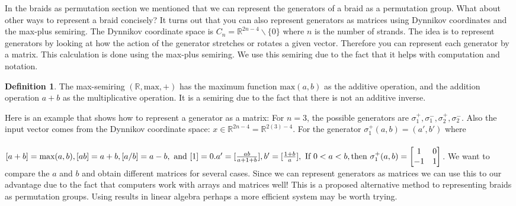 \documentclass{article}
\theoremstyle{definition}
\newtheorem{definition}{Definition}[section]
\begin{document}
In the braids as permutation section we mentioned that we can represent the generators of a braid as a permutation group. What about other ways to represent a braid concisely? It turns out that you can also represent generators as matrices using Dynnikov coordinates and the max-plus semiring. The Dynnikov coordinate space is $C_n=\mathbb{R}^{2n-4} \backslash \{0\}$ where $n$ is the number of strands. The idea is to represent generators by looking at how the action of the generator stretches or rotates a given vector. Therefore you can represent each generator by a matrix. This calculation is done using the max-plus semiring. We use this semiring due to the fact that it helps with computation and notation. 

\begin{definition}
The max-semiring $(\mathbb{R},\text{max},+)$ has the maximum function $\text{max}(a,b)$ as the additive operation, and the addition operation $a+b$ as the multiplicative operation. It is a semiring due to the fact that there is not an additive inverse.
\end{definition}

\noindent Here is an example that shows how to represent a generator as a matrix: For $n=3$, the possible generators are $\sigma_1^+, \sigma_1^-, \sigma_2^+, \sigma_2^-$. Also the input vector comes from the Dynnikov coordinate space: $x \in \mathbb{R}^{2n-4} = \mathbb{R}^{2(3)-4}$. For the generator $\sigma_1^+ (a,b)=(a',b')$ where 
\\ \\
$[a+b]=\text{max}(a,b), [ab]=a+b, [a/b]=a-b, \text{ and } [1]=0. \\ \\ a'=[\frac{ab}{a+1+b}], b'=[\frac{1+b}{a}],   \\ \text{ If } 0<a<b , \text{then } \sigma_1^+ (a,b)=
\begin{bmatrix}
1 & 0\\
-1 & 1
\end{bmatrix} $. We want to compare the $a$ and $b$ and obtain different matrices for several cases. Since we can represent generators as matrices we can use this to our advantage due to the fact that computers work with arrays and matrices well! This is a proposed alternative method to representing braids as permutation groups. Using results in linear algebra perhaps a more efficient system may be worth trying. 
\end{document}
